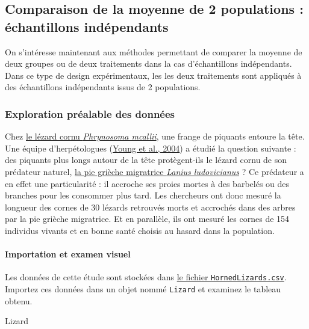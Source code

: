 \documentclass[
  a4paper,
]{article}
\newenvironment{Shaded}{\begin{snugshade}}{\end{snugshade}}
\newcommand{\NormalTok}[1]{\textcolor[rgb]{0.12,0.11,0.11}{#1}}
\begin{document}
\hypertarget{Indep}{%
\subsection{Comparaison de la moyenne de 2 populations : échantillons indépendants}\label{Indep}}

On s'intéresse maintenant aux méthodes permettant de comparer la moyenne de deux groupes ou de deux traitements dans la cas d'échantillons indépendants. Dans ce type de design expérimentaux, les les deux traitements sont appliqués à des échantillons indépendants issus de 2 populations.

\hypertarget{exploration-pruxe9alable-des-donnuxe9es}{%
\subsubsection{Exploration préalable des données}\label{exploration-pruxe9alable-des-donnuxe9es}}

Chez \href{https://fr.wikipedia.org/wiki/Phrynosoma_mcallii}{le lézard cornu \emph{Phrynosoma mcallii}}, une frange de piquants entoure la tête. Une équipe d'herpétologues (\protect\hyperlink{ref-Young2004}{Young et al., 2004}) a étudié la question suivante : des piquants plus longs autour de la tête protègent-ils le lézard cornu de son prédateur naturel, \href{https://fr.wikipedia.org/wiki/Pie-grièche_migratrice}{la pie grièche migratrice \emph{Lanius ludovicianus}} ? Ce prédateur a en effet une particularité : il accroche ses proies mortes à des barbelés ou des branches pour les consommer plus tard. Les chercheurs ont donc mesuré la longueur des cornes de 30 lézards retrouvés morts et accrochés dans des arbres par la pie grièche migratrice. Et en parallèle, ils ont mesuré les cornes de 154 individus vivants et en bonne santé choisis au hasard dans la population.

\hypertarget{importation-et-examen-visuel-2}{%
\paragraph{Importation et examen visuel}\label{importation-et-examen-visuel-2}}

Les données de cette étude sont stockées dans \href{https://besibo.github.io/Biometrie3/data/HornedLizards.csv}{le fichier \texttt{HornedLizards.csv}}. Importez ces données dans un objet nommé \texttt{Lizard} et examinez le tableau obtenu.

\begin{Shaded}
\begin{Highlighting}[]
\NormalTok{Lizard}
\end{Highlighting}
\end{Shaded}
\end{document}
